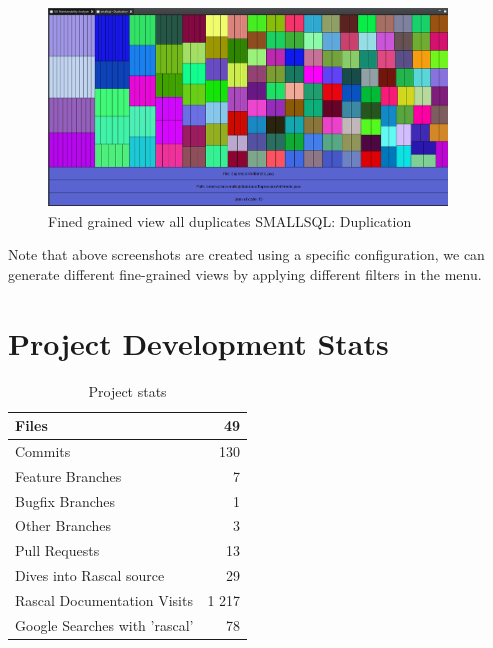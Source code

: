 \documentclass{article}
\begin{document}
\begin{figure}[!htbp]
	\centering
	\label{fig:duplication}
	\caption{Fined grained view all duplicates SMALLSQL: Duplication}
	\includegraphics[width=400px, height=200px]{smallsql_duplication.png}
\end{figure}

Note that above screenshots are created using a specific configuration, we can generate different fine-grained views by applying different filters in the menu.

\section{Project Development Stats}

\begin{table}[!htb]
\caption{Project stats}
\begin{tabular}{l|r}	
		\hline
		Files										&			49 \\
		\hline
		Commits										&			130 \\
		\hline
		Feature Branches							&			7 \\
		\hline
		Bugfix Branches								&			1 \\
		\hline
		Other Branches								&			3 \\
		\hline	
		Pull Requests								&			13 \\
		\hline	
		Dives into Rascal source					&			29 \\
		\hline		
		Rascal Documentation Visits					&			1 217 \\ %
		\hline		
		Google Searches with 'rascal'				&			78 \\	%
		\hline		
\end{tabular}
\end{table}
\end{document}
